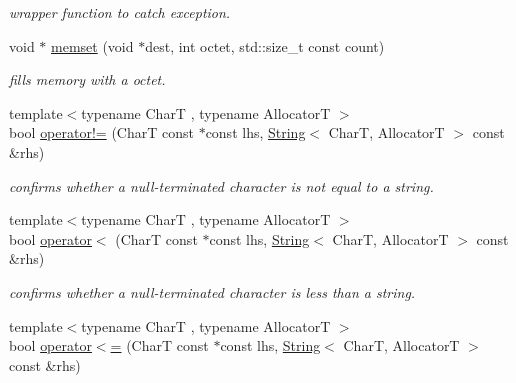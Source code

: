 \begin{DoxyCompactItemize}
\begin{DoxyCompactList}\small\item\em wrapper function to catch exception. \end{DoxyCompactList}\item 
\hypertarget{namespacehryky_a50f9095eab4dc96e5fa813f8fc8fba7e}{void $\ast$ \hyperlink{namespacehryky_a50f9095eab4dc96e5fa813f8fc8fba7e}{memset} (void $\ast$dest, int octet, std\-::size\-\_\-t const count)}\label{namespacehryky_a50f9095eab4dc96e5fa813f8fc8fba7e}

\begin{DoxyCompactList}\small\item\em fills memory with a octet. \end{DoxyCompactList}\item 
\hypertarget{namespacehryky_af83d27d9a54004f5981499e910bb7cb8}{{\footnotesize template$<$typename Char\-T , typename Allocator\-T $>$ }\\bool \hyperlink{namespacehryky_af83d27d9a54004f5981499e910bb7cb8}{operator!=} (Char\-T const $\ast$const lhs, \hyperlink{classhryky_1_1_string}{String}$<$ Char\-T, Allocator\-T $>$ const \&rhs)}\label{namespacehryky_af83d27d9a54004f5981499e910bb7cb8}

\begin{DoxyCompactList}\small\item\em confirms whether a null-\/terminated character is not equal to a string. \end{DoxyCompactList}\item 
\hypertarget{namespacehryky_a7db2acd798ff6883387f9cbe3b3e820d}{{\footnotesize template$<$typename Char\-T , typename Allocator\-T $>$ }\\bool \hyperlink{namespacehryky_a7db2acd798ff6883387f9cbe3b3e820d}{operator$<$} (Char\-T const $\ast$const lhs, \hyperlink{classhryky_1_1_string}{String}$<$ Char\-T, Allocator\-T $>$ const \&rhs)}\label{namespacehryky_a7db2acd798ff6883387f9cbe3b3e820d}

\begin{DoxyCompactList}\small\item\em confirms whether a null-\/terminated character is less than a string. \end{DoxyCompactList}\item 
\hypertarget{namespacehryky_a3841c4dbefd9eeed038376b3044dec2b}{{\footnotesize template$<$typename Char\-T , typename Allocator\-T $>$ }\\bool \hyperlink{namespacehryky_a3841c4dbefd9eeed038376b3044dec2b}{operator$<$=} (Char\-T const $\ast$const lhs, \hyperlink{classhryky_1_1_string}{String}$<$ Char\-T, Allocator\-T $>$ const \&rhs)}\label{namespacehryky_a3841c4dbefd9eeed038376b3044dec2b}


\end{DoxyCompactItemize}
